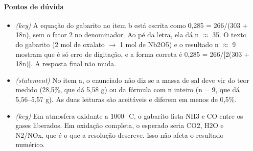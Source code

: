\documentclass{article}%
\begin{document}
\paragraph{Pontos de dúvida}%
\begin{itemize}%
\item%
\textit{(key)} A equação do gabarito no item b está escrita como 0,285 = 266/(303 + 18n), sem o fator 2 no denominador. Ao pé da letra, ela dá n $\approx$ 35. O texto do gabarito (2 mol de oxalato $\to$ 1 mol de Nb2O5) e o resultado n $\approx$ 9 mostram que é só erro de digitação, e a forma correta é 0,285 = 266/{[}2(303 + 18n){]}. A resposta final não muda.%
\item%
\textit{(statement)} No item a, o enunciado não diz se a massa de sal deve vir do teor medido (28,5\%, que dá 5,58 g) ou da fórmula com n inteiro (n = 9, que dá 5,56--5,57 g). As duas leituras são aceitáveis e diferem em menos de 0,5\%.%
\item%
\textit{(key)} Em atmosfera oxidante a 1000 $^\circ$C, o gabarito lista NH3 e CO entre os gases liberados. Em oxidação completa, o esperado seria CO2, H2O e N2/NOx, que é o que a resolução descreve. Isso não afeta o resultado numérico.%
\end{itemize}%
\end{document}
